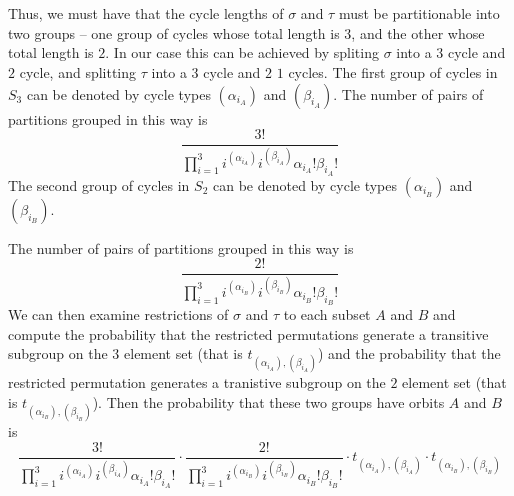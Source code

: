 	\\\\Thus, we must have that the cycle lengths of $\sigma$ and $\tau$ must be partitionable into two groups -- one group of cycles whose total length is $3$, and the other whose total length is $2$. In our case this can be achieved by spliting $\sigma$ into a $3$ cycle and $2$ cycle, and splitting $\tau$ into a $3$ cycle and $2$ $1$ cycles. The first group of cycles in $S_3$ can be denoted by cycle types $(\alpha_{i_A})$ and $(\beta_{i_A})$. The number of pairs of partitions grouped in this way is
	\[
		\frac{3!}{\prod_{i=1}^3i^{(\alpha_{i_A})}i^{(\beta_{i_A})}\alpha_{i_A}!\beta_{i_A}!}
	\]
	The second group of cycles in $S_2$ can be denoted by cycle types $(\alpha_{i_B})$ and $(\beta_{i_B})$.

	The number of pairs of partitions grouped in this way is
	\[
		\frac{2!}{\prod_{i=1}^3i^{(\alpha_{i_B})}i^{(\beta_{i_B})}\alpha_{i_B}!\beta_{i_B}!}
	\]
	We can then examine restrictions of $\sigma$ and $\tau$ to each subset $A$ and $B$ and compute the probability that the restricted permutations generate a transitive subgroup on the $3$ element set (that is $t_{(\alpha_{i_A}), (\beta_{i_A})}$) and the probability that the restricted permutation generates a tranistive subgroup on the $2$ element set (that is $t_{(\alpha_{i_B}), (\beta_{i_B})}$). Then the probability that these two groups have orbits $A$ and $B$ is
\[
	\frac{3!}{\prod_{i=1}^3i^{(\alpha_{i_A})}i^{(\beta_{i_A})}\alpha_{i_A}!\beta_{i_A}!}\cdot\frac{2!}{\prod_{i=1}^3i^{(\alpha_{i_B})}i^{(\beta_{i_B})}\alpha_{i_B}!\beta_{i_B}!}\cdot t_{(\alpha_{i_A}), (\beta_{i_A})}\cdot t_{(\alpha_{i_B}), (\beta_{i_B})}
\]
